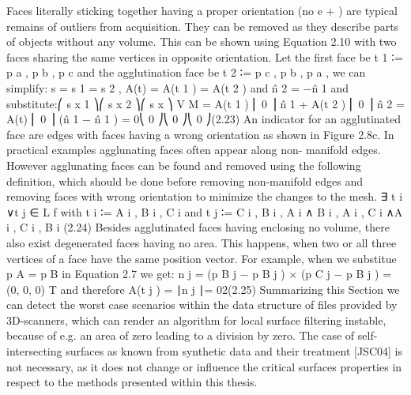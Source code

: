 Faces literally sticking together having a proper orientation (no e + ) are typical remains
of outliers from acquisition. They can be removed as they describe parts of objects
without any volume. This can be shown using Equation 2.10 with two faces sharing
the same vertices in opposite orientation. Let the first face be t 1 ∶= {p a , p b , p c } and the
agglutination face be t 2 ∶= {p c , p b , p a }, we can simplify: s = s 1 = s 2 , A(t) =
A(t 1 ) = A(t 2 ) and n̂ 2 = −n̂ 1 and substitute:⎛ s x 1 ⎞⎛ s x 2 ⎞⎛ s x ⎞
V M = A(t 1 ) ⎜ 0 ⎟ n̂ 1 + A(t 2 ) ⎜ 0 ⎟ n̂ 2 = A(t) ⎜ 0 ⎟ (n̂ 1 − n̂ 1 ) = 0⎝ 0 ⎠⎝ 0 ⎠⎝ 0 ⎠(2.23)
An indicator for an agglutinated face are edges with faces having a wrong orientation as
shown in Figure 2.8c. In practical examples agglunating faces often appear along non-
manifold edges. However agglunating faces can be found and removed using the following
definition, which should be done before removing non-manifold edges and removing faces
with wrong orientation to minimize the changes to the mesh.
∃ t i ∨t j ∈ L f with t i ∶= {A i , B i , C i } and t j ∶= {C i , B i , A i }∧
{B i , A i , C i }∧{A i , C i , B i } (2.24)
Besides agglutinated faces having enclosing no volume, there also exist degenerated
faces having no area. This happens, when two or all three vertices of a face have the same
position vector. For example, when we substitue p A = p B in Equation 2.7 we get:
n j = (p B j − p B j ) × (p C j − p B j ) = (0, 0, 0) T and therefore A(t j ) =
∣n j ∣= 02(2.25)
Summarizing this Section we can detect the worst case scenarios within the data
structure of files provided by 3D-scanners, which can render an algorithm for local surface
filtering instable, because of e.g. an area of zero leading to a division by zero. The case
of self-intersecting surfaces as known from synthetic data and their treatment [JSC04] is
not necessary, as it does not change or influence the critical surfaces properties in respect
to the methods presented within this thesis.~\cite[p.~32]{Mara12}

